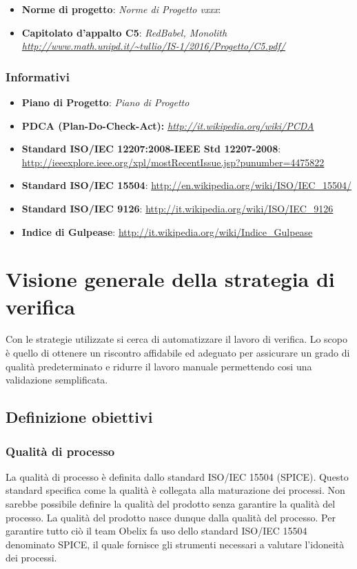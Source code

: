 \begin{itemize}
\item \textbf{Norme di progetto}:  \emph{Norme di Progetto vxxx}:
\item \textbf{Capitolato d'appalto C5}: \emph{RedBabel, Monolith \url{http://www.math.unipd.it/~tullio/IS-1/2016/Progetto/C5.pdf/}}

\end{itemize}

\subsubsection{Informativi}

\begin{itemize}
\item \textbf{Piano di Progetto}: \emph{Piano di Progetto}
\item \textbf{PDCA (Plan-Do-Check-Act): } \emph{\url{http://it.wikipedia.org/wiki/PCDA}}
\item \textbf{Standard ISO/IEC 12207:2008-IEEE Std 12207-2008}: \url{http://ieeexplore.ieee.org/xpl/mostRecentIssue.jsp?punumber=4475822}
\item \textbf{Standard ISO/IEC 15504}:  \url{http://en.wikipedia.org/wiki/ISO/IEC\_15504/}
\item \textbf{Standard ISO/IEC 9126}: \url{http://it.wikipedia.org/wiki/ISO/IEC\_9126}
\item \textbf{Indice di Gulpease}: \url{http://it.wikipedia.org/wiki/Indice\_Gulpease}
\end{itemize}



\section{Visione generale della strategia di verifica}

Con le strategie utilizzate si cerca di automatizzare il lavoro di
verifica. Lo scopo è quello di ottenere un riscontro affidabile ed
adeguato per assicurare un grado di qualità predeterminato e ridurre
il lavoro manuale permettendo cosi una validazione semplificata. 


\subsection{Definizione obiettivi}


\subsubsection{Qualità di processo}
La qualità di processo è definita dallo standard ISO/IEC 15504 (SPICE). Questo standard specifica come la qualità è collegata alla maturazione dei processi.
Non sarebbe possibile definire la qualità del prodotto senza garantire
la qualità del processo. La qualità del prodotto nasce dunque dalla
qualità del processo. Per garantire tutto ciò il team Obelix fa uso
dello standard ISO/IEC 15504 denominato SPICE, il quale fornisce gli
strumenti necessari a valutare l'idoneità dei processi. 

